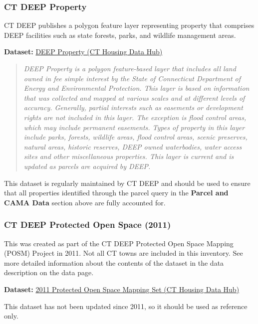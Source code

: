 \documentclass[
  letterpaper,
  DIV=11,
  numbers=noendperiod]{scrreprt}
\begin{document}
\subsubsection{CT DEEP Property}\label{sec-ct-deep-property}

CT DEEP publishes a polygon feature layer representing property that
comprises DEEP facilities such as state forests, parks, and wildlife
management areas.

\textbf{Dataset:}
\href{https://housingmaps.ct.gov/datasets/CTDEEP::deep-property-3/about}{DEEP
Property (CT Housing Data Hub)}

\begin{quote}
\emph{DEEP Property is a polygon feature-based layer that includes all
land owned in fee simple interest by the State of Connecticut Department
of Energy and Environmental Protection. This layer is based on
information that was collected and mapped at various scales and at
different levels of accuracy. Generally, partial interests such as
easements or development rights are not included in this layer. The
exception is flood control areas, which may include permanent easements.
Types of property in this layer include parks, forests, wildlife areas,
flood control areas, scenic preserves, natural areas, historic reserves,
DEEP owned waterbodies, water access sites and other miscellaneous
properties. This layer is current and is updated as parcels are acquired
by DEEP.}
\end{quote}

This dataset is regularly maintained by CT DEEP and should be used to
ensure that all properties identified through the parcel query in the
\textbf{Parcel and CAMA Data} section above are fully accounted for.

\subsubsection{CT DEEP Protected Open Space
(2011)}\label{sec-ct-deep-protected-open-space-2011}

This was created as part of the CT DEEP Protected Open Space Mapping
(POSM) Project in 2011. Not all CT towns are included in this inventory.
See more detailed information about the contents of the dataset in the
data description on the data page.

\textbf{Dataset:}
\href{https://housingmaps.ct.gov/maps/80c5e61b6e86423d9089350785e709a3/about}{2011
Protected Open Space Mapping Set (CT Housing Data Hub)}

This dataset has not been updated since 2011, so it should be used as
reference only.
\end{document}
